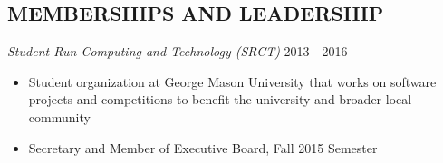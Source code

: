 \documentclass[margin, 10pt]{res} %
\begin{document}
\begin{resume}

\section{MEMBERSHIPS AND LEADERSHIP}
{\sl Student-Run Computing and Technology (SRCT)} \hfill 2013 - 2016 \begin{itemize} \itemsep -2pt %
\item Student organization at George Mason University that works on software projects and competitions to benefit the university and broader local community
\item Secretary and Member of Executive Board, Fall 2015 Semester
\end{itemize}


\end{resume}
\end{document}
